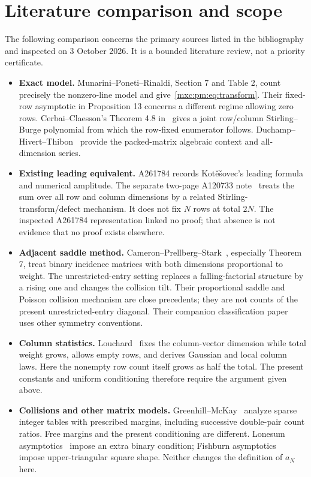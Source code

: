 \documentclass[11pt]{article}
\numberwithin{equation}{section}
\theoremstyle{definition}
\theoremstyle{remark}
\begin{document}
\section{Literature comparison and scope}\label{mxc:pm:sec:literature}
The following comparison concerns the primary sources listed in the
bibliography and inspected on 3 October 2026. It is a bounded literature
review, not a priority certificate.
\begin{itemize}
\item \textbf{Exact model.} Munarini--Poneti--Rinaldi, Section 7 and Table 2,
count precisely the nonzero-line model and give~\eqref{mxc:pm:eq:transform}.
Their fixed-row asymptotic in Proposition 13 concerns a different regime
allowing zero rows. Cerbai--Claesson's Theorem 4.8 in~\cite{pmcc25} gives a
joint row/column Stirling--Burge polynomial from which the row-fixed
enumerator follows. Duchamp--Hivert--Thibon~\cite{pmdht} provide the
packed-matrix algebraic context and all-dimension series.
\item \textbf{Existing leading equivalent.} A261784 records
Kot\v e\v sovec's leading formula and numerical amplitude. The separate
two-page A120733 note~\cite{pmkot15} treats the sum over all row and column
dimensions by a related Stirling-transform/defect mechanism. It does not fix
$N$ rows at total $2N$. The inspected A261784 representation linked no proof;
that absence is not evidence that no proof exists elsewhere.
\item \textbf{Adjacent saddle method.} Cameron--Prellberg--Stark~\cite{pmcps},
especially Theorem 7, treat binary incidence matrices with both dimensions
proportional to weight. The unrestricted-entry setting replaces a
falling-factorial structure by a rising one and changes the collision tilt.
Their proportional saddle and Poisson collision mechanism are close
precedents; they are not counts of the present unrestricted-entry diagonal.
Their companion classification paper~\cite{pmcpsclasses} uses other symmetry
conventions.
\item \textbf{Column statistics.} Louchard~\cite{louchard} fixes the
column-vector dimension while total weight grows, allows empty rows, and
derives Gaussian and local column laws. Here the nonempty row count itself
grows as half the total. The present constants and uniform conditioning
therefore require the argument given above.
\item \textbf{Collisions and other matrix models.} Greenhill--McKay~\cite{pmgm}
analyze sparse integer tables with prescribed margins, including successive
double-pair count ratios. Free margins and the present conditioning are
different. Lonesum asymptotics~\cite{pmklm} impose an extra binary condition;
Fishburn asymptotics~\cite{pmhjs} impose upper-triangular square shape.
Neither changes the definition of $a_N$ here.
\end{itemize}
\end{document}
